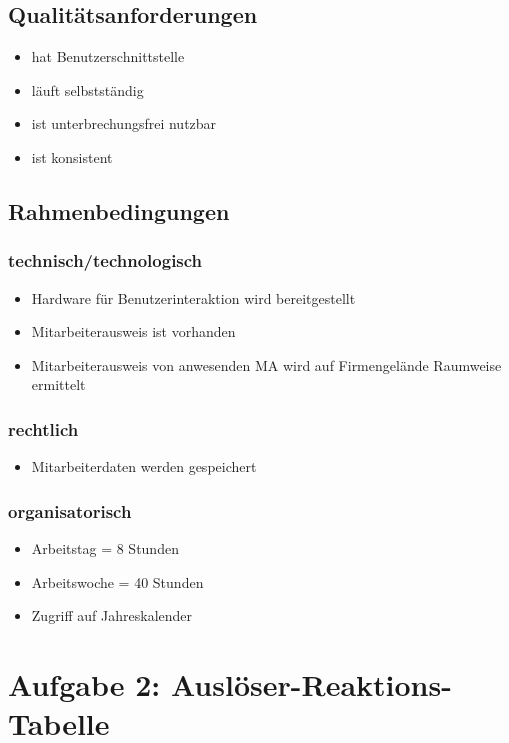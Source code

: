 \section{Qualitätsanforderungen}

\begin{itemize}
\item hat Benutzerschnittstelle
\item läuft selbstständig
\item ist unterbrechungsfrei nutzbar %
\item ist konsistent
\end{itemize}

\section{Rahmenbedingungen}
\subsection{technisch/technologisch}
\begin{itemize}
\item Hardware für Benutzerinteraktion wird bereitgestellt
\item Mitarbeiterausweis ist vorhanden
\item Mitarbeiterausweis von anwesenden MA wird auf Firmengelände Raumweise ermittelt
\end{itemize}
\subsection{rechtlich}
\begin{itemize}
\item Mitarbeiterdaten werden gespeichert
\end{itemize}
\subsection{organisatorisch}
\begin{itemize}
\item Arbeitstag = 8 Stunden
\item Arbeitswoche = 40 Stunden
\item Zugriff auf Jahreskalender
\end{itemize}

\chapter*{Aufgabe 2: Auslöser-Reaktions-Tabelle}
\addtocounter{chapter}{1}


